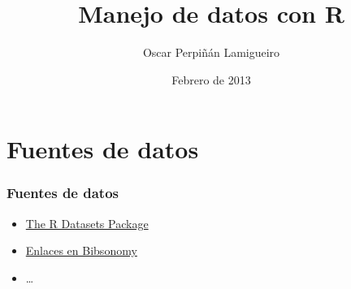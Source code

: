 \documentclass[xcolor={usenames,svgnames,dvipsnames}]{beamer}
\title{Manejo de datos con R}
\author{Oscar Perpiñán Lamigueiro}
\date{Febrero de 2013}
\begin{document}
\maketitle



\section{Fuentes de datos}
\label{sec-1}
\begin{frame}
\frametitle{Fuentes de datos}
\label{sec-1-1}


\begin{itemize}
\item \href{http://stat.ethz.ch/R-manual/R-patched/library/datasets/html/00Index.html}{The R Datasets Package}
\item \href{http://www.bibsonomy.org/user/procomun/data}{Enlaces en Bibsonomy}
\item \ldots{}
\end{itemize}
\end{frame}
\end{document}
